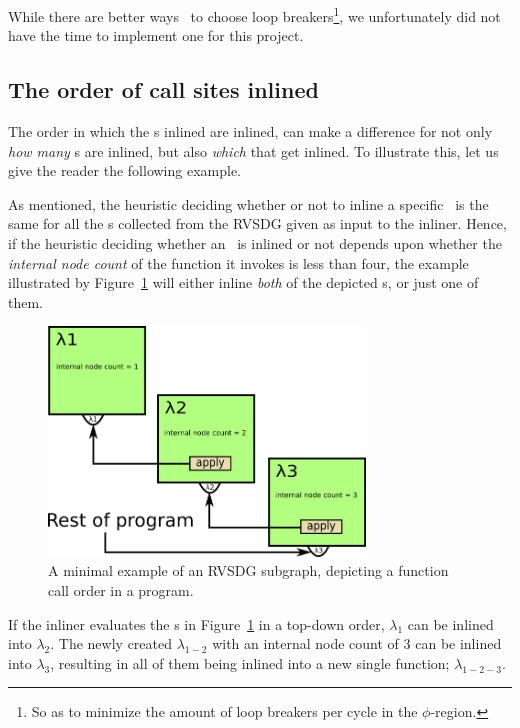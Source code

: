 While there are better ways~\cite{BasMscThesis} to choose loop
breakers\footnote{So as to minimize the amount of loop breakers per cycle in the
$\phi$-region.}, we unfortunately did not have the time to implement one for
this project.

\subsection{The order of call sites inlined}
\label{sub:scheme:ordering_apply_nodes}

The order in which the \applyNode s inlined are inlined, can make a difference
for not only \textit{how many} \applyNode s are inlined, but also \textit{which}
that get inlined. To illustrate this, let us give the reader the following
example.

As mentioned, the heuristic deciding whether or not to inline a specific
\applyNode~is the same for all the \applyNode s collected from the RVSDG given
as input to the inliner. Hence, if the heuristic deciding whether an
\applyNode~is inlined or not depends upon whether the \textit{internal node
count} of the function it invokes is less than four, the example illustrated by
Figure~\ref{fig:inline_ordering_ex} will either inline \textit{both} of the
depicted \applyNode s, or just one of them.

\begin{figure}[H]
	\centering
	\includegraphics[width=0.75\textwidth]{figures/inline_ordering_ex}
	\caption{A minimal example of an RVSDG subgraph, depicting a function call
order in a program.}
	\label{fig:inline_ordering_ex}
\end{figure}

If the inliner evaluates the \applyNode s in Figure~\ref{fig:inline_ordering_ex}
in a top-down order, $\lambda_1$ can be inlined into $\lambda_2$. The newly
created $\lambda_{1-2}$ with an internal node count of $3$ can be inlined into
$\lambda_3$, resulting in all of them being inlined into a new single function;
$\lambda_{1-2-3}$.

